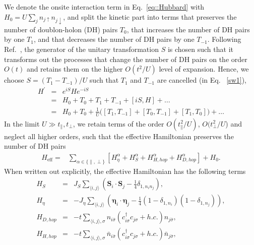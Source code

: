 \documentclass[aps,prb,twocolumn,floats,superscriptaddress,epsfig]{revtex4-1}
\begin{document}
We denote the onsite interaction term in Eq.~\eqref{eq::Hubbard} with $H_0=U\sum_j n_{j\uparrow} n_{j\downarrow}$, and split the kinetic part into terms that preserves the number of doublon-holon (DH) pairs $T_0$,  that increases the number of DH pairs by one $T_1$, and that decreases the number of DH pairs by one $T_{-1}$. Following Ref.~, the generator of the unitary transformation $S$ is chosen such that it transforms out the processes that change the number of DH pairs on the order $O(t)$ and retains them on the higher $O(t^2/U)$ level of expansion. %
Hence, we choose $S=(T_1 - T_{-1})/U$ such that $T_1$ and $T_{-1}$ are cancelled (in Eq. ~\eqref{sw1}),
\begin{eqnarray}
\label{sw1}
H^{\prime}&=& e^{iS} H e^{-iS} \\
&=& H_0 + T_0 + T_1 + T_{-1} + [ i S, H] + \dots \nonumber\\
&=& H_0 + T_0 + \frac{1}{U} \big( [ T_1 , T_{-1} ] + [T_0 , T_{-1}] + [ T_1 , T_0 ] \big) + \dots \nonumber
\end{eqnarray}
In the limit $U\gg t_{\parallel},t_{\perp}$, we retain terms of the order $O(t_{\parallel}^2/U)$, $O(t_{\perp}^2/U$)  and neglect all higher orders, such that the effective Hamiltonian preserves the number of DH pairs \\
\begin{eqnarray}\label{eq::Heff}
H_{\text{eff}}=& \sum\limits_{\alpha\in\{\parallel,\perp\}} \left[ H_{\eta}^{\alpha}+H_{S}^{\alpha}+H_{H,hop}^{\alpha}+H_{D,hop}^{\alpha}\right]+H_0\nonumber.
\end{eqnarray}
When written out explicitly, the effective Hamiltonian has the following terms\cite{murakami2022}
\begin{eqnarray}
H_{S}&=&  J_{S} \sum_{\langle i, j\rangle } \left(\boldsymbol{S}_{i } \cdot  \boldsymbol{S}_{j} -\frac{1}{4} \delta_{1,n_{i }  n_{j }}\right) ,\nonumber \\  
H_{\eta}&=&  -J_{\eta} \sum_{\langle i,j\rangle}
\left(\boldsymbol{\eta}_{i} \cdot \boldsymbol{\eta}_{j } - \frac{1}{4}(1-\delta_{1,n_{i }})(1-\delta_{1,n_{j}})\right), \label{eq:H_eta}\nonumber\\
H_{D,hop}&=& -t \sum_{\langle i,j\rangle , \sigma} n_{i \bar{\sigma} } ( c^{\dagger}_{i \sigma } c_{j \sigma } + h.c. ) n_{j \bar{\sigma} },\label{eq:Dhop}\nonumber\\ 
H_{H,hop}&=& -t \sum_{\langle i,j\rangle , \sigma} \bar{n}_{i \bar{\sigma} } ( c^{\dagger}_{i \sigma } c_{j \sigma } + h.c. ) \bar{n}_{j \bar{\sigma} }, \label{eq:Hhop} \\ \nonumber
 \label{htj}
\end{eqnarray}
\end{document}
